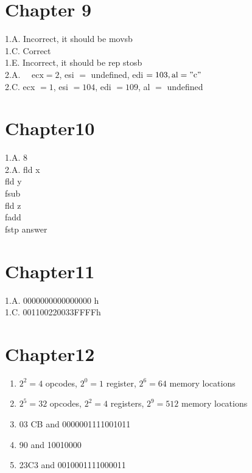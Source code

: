 \documentclass[10pt]{article}
\begin{document}
\section*{Chapter 9}
1.A. Incorrect, it should be movsb\\
1.C. Correct\\
1.E. Incorrect, it should be rep stosb\\
2.A. $\quad \mathrm{ecx}=2$, esi $=$ undefined, edi $=103, \mathrm{al}=" \mathrm{c} "$\\
2.C. ecx $=1$, esi $=104$, edi $=109$, al $=$ undefined

\section*{Chapter10}
1.A. 8\\
2.A. fld x\\
fld y\\
fsub\\
fld z\\
fadd\\
fstp answer

\section*{Chapter11}
1.A. 0000000000000000 h\\
1.C. 001100220033FFFFh

\section*{Chapter12}
\begin{enumerate}
  \item $2^{2}=4$ opcodes, $2^{0}=1$ register, $2^{6}=64$ memory locations
  \item $2^{5}=32$ opcodes, $2^{2}=4$ registers, $2^{9}=512$ memory locations
  \item 03 CB and 0000001111001011
  \item 90 and 10010000
  \item 23C3 and 0010001111000011
\end{enumerate}
\end{document}
